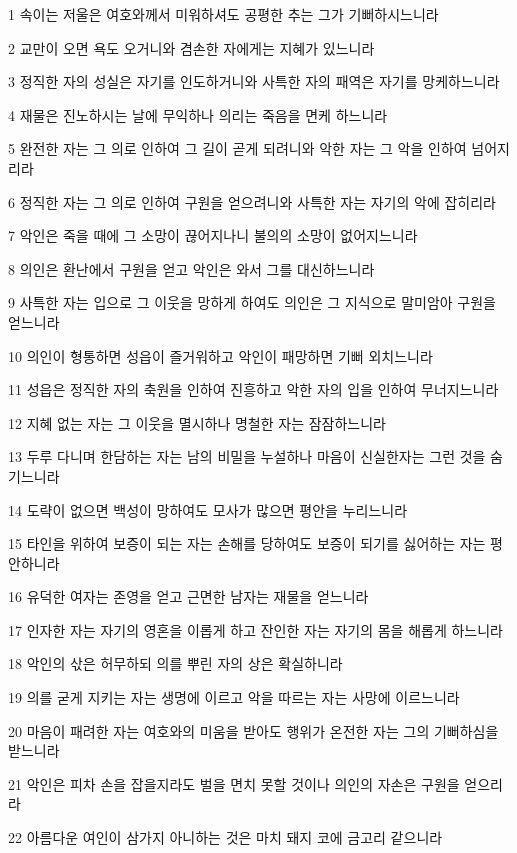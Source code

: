 \par 1 속이는 저울은 여호와께서 미워하셔도 공평한 추는 그가 기뻐하시느니라
\par 2 교만이 오면 욕도 오거니와 겸손한 자에게는 지혜가 있느니라
\par 3 정직한 자의 성실은 자기를 인도하거니와 사특한 자의 패역은 자기를 망케하느니라
\par 4 재물은 진노하시는 날에 무익하나 의리는 죽음을 면케 하느니라
\par 5 완전한 자는 그 의로 인하여 그 길이 곧게 되려니와 악한 자는 그 악을 인하여 넘어지리라
\par 6 정직한 자는 그 의로 인하여 구원을 얻으려니와 사특한 자는 자기의 악에 잡히리라
\par 7 악인은 죽을 때에 그 소망이 끊어지나니 불의의 소망이 없어지느니라
\par 8 의인은 환난에서 구원을 얻고 악인은 와서 그를 대신하느니라
\par 9 사특한 자는 입으로 그 이웃을 망하게 하여도 의인은 그 지식으로 말미암아 구원을 얻느니라
\par 10 의인이 형통하면 성읍이 즐거워하고 악인이 패망하면 기뻐 외치느니라
\par 11 성읍은 정직한 자의 축원을 인하여 진흥하고 악한 자의 입을 인하여 무너지느니라
\par 12 지혜 없는 자는 그 이웃을 멸시하나 명철한 자는 잠잠하느니라
\par 13 두루 다니며 한담하는 자는 남의 비밀을 누설하나 마음이 신실한자는 그런 것을 숨기느니라
\par 14 도략이 없으면 백성이 망하여도 모사가 많으면 평안을 누리느니라
\par 15 타인을 위하여 보증이 되는 자는 손해를 당하여도 보증이 되기를 싫어하는 자는 평안하니라
\par 16 유덕한 여자는 존영을 얻고 근면한 남자는 재물을 얻느니라
\par 17 인자한 자는 자기의 영혼을 이롭게 하고 잔인한 자는 자기의 몸을 해롭게 하느니라
\par 18 악인의 삯은 허무하되 의를 뿌린 자의 상은 확실하니라
\par 19 의를 굳게 지키는 자는 생명에 이르고 악을 따르는 자는 사망에 이르느니라
\par 20 마음이 패려한 자는 여호와의 미움을 받아도 행위가 온전한 자는 그의 기뻐하심을 받느니라
\par 21 악인은 피차 손을 잡을지라도 벌을 면치 못할 것이나 의인의 자손은 구원을 얻으리라
\par 22 아름다운 여인이 삼가지 아니하는 것은 마치 돼지 코에 금고리 같으니라
